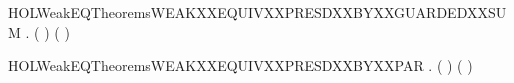 \newcommand{\HOLWeakEQTheoremsWEAKXXEQUIVXXISXXWEAKXXBISIM}{\UseVerbatim{HOLWeakEQTheoremsWEAKXXEQUIVXXISXXWEAKXXBISIM}}
\begin{SaveVerbatim}{HOLWeakEQTheoremsWEAKXXEQUIVXXPRESDXXBYXXGUARDEDXXSUM}
\HOLTokenTurnstile{} \HOLSymConst{\HOLTokenForall{}}     .
          \HOLSymConst{\HOLTokenConj{}}    \HOLSymConst{\HOLTokenImp{}}
        ( \HOLSymConst{\ensuremath{+}} ) ( \HOLSymConst{\ensuremath{+}} )
\end{SaveVerbatim}
\newcommand{\HOLWeakEQTheoremsWEAKXXEQUIVXXPRESDXXBYXXGUARDEDXXSUM}{\UseVerbatim{HOLWeakEQTheoremsWEAKXXEQUIVXXPRESDXXBYXXGUARDEDXXSUM}}
\begin{SaveVerbatim}{HOLWeakEQTheoremsWEAKXXEQUIVXXPRESDXXBYXXPAR}
\HOLTokenTurnstile{} \HOLSymConst{\HOLTokenForall{}}   .
          \HOLSymConst{\HOLTokenConj{}}    \HOLSymConst{\HOLTokenImp{}}
        ( \HOLSymConst{\ensuremath{\parallel}} ) ( \HOLSymConst{\ensuremath{\parallel}} )
\end{SaveVerbatim}
\newcommand{\HOLWeakEQTheoremsWEAKXXEQUIVXXPRESDXXBYXXPAR}{\UseVerbatim{HOLWeakEQTheoremsWEAKXXEQUIVXXPRESDXXBYXXPAR}}
